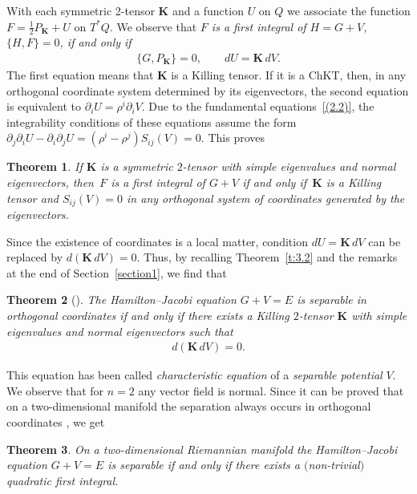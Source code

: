 \documentclass[10pt,a4paper]{amsart}
\def\bs{\boldsymbol}
\numberwithin{equation}{section}
\newtheorem{Theorem}{Theorem}[section]
 { \theoremstyle{definition}
\newtheorem{Notation}[Theorem]{Notation}
\newtheorem{Example}[Theorem]{Example}
\newtheorem{Remark}[Theorem]{Remark}
\newtheorem{Remarks}[Theorem]{Remarks}
 }
\begin{document}
With each symmetric 2-tensor $\bs K$ and a function $U$ on $Q$ we associate the function $F=\tfrac 12  P_{\bs K}+U$ on $T^*Q$. We observe that {\it $F$ is a first integral of $H=G+V$, $\{H,F\}=0$, if and only if}
\begin{gather*}
\{G,P_{\bs K}\}=0, \qquad dU=\bs K\,dV.
\end{gather*}
The f\/irst equation means that $\bs K$ is a Killing tensor. If it is a ChKT, then, in any orthogonal coordinate system determined by its eigenvectors, the second equation is equivalent to $\partial_iU=\rho^i\partial_iV$.
Due to the fundamental equations~\eqref{(2.2)}, the integrability conditions of these equations assume the form
$\partial_j\partial_iU-\partial_i\partial_jU=(\rho^i-\rho^j) S_{ij}(V)=0$. This proves

\begin{Theorem}\label{t:4.1}
If $\bs K$ is a symmetric $2$-tensor with simple eigenvalues and normal eigenvectors, then~$F$ is a first integral of $G+V$ if and only if~$\bs K$ is a Killing tensor and $S_{ij}(V)=0$ in any orthogonal system of coordinates generated by the eigenvectors.
\end{Theorem}

Since the existence of coordinates is a local matter, condition $d U=\bs K\,dV$ can be replaced by $d(\bs K\,dV)=0$. Thus, by recalling Theorem~\ref{t:3.2}  and the remarks at the end of Section~\ref{section1},  we f\/ind that

\begin{Theorem}[\cite{Benenti-1993}]\label{t:4.2}
The Hamilton--Jacobi equation $G+V=E$ is separable in orthogonal coordinates if and only if there exists a Killing $2$-tensor $\bs K$ with simple eigenvalues and normal eigenvectors such that
\begin{gather}
d(\bs K\,dV)=0.
\label{(4.1)}
\end{gather}
\end{Theorem}

This equation has been called {\it characteristic equation} of a {\it separable potential} $V$.
We observe that for $n=2$ any vector f\/ield is normal. Since it can be proved that on a two-dimensional manifold the separation always occurs in orthogonal coordinates \cite{LC-1904}, we get

\begin{Theorem}\label{t:4.3}\sloppy
On a two-dimensional Riemannian manifold the Hamilton--Jacobi equation \mbox{$G+V=E$} is separable if and only if there exists a $($non-trivial$)$ quadratic first integral.
\end{Theorem}
\end{document}
